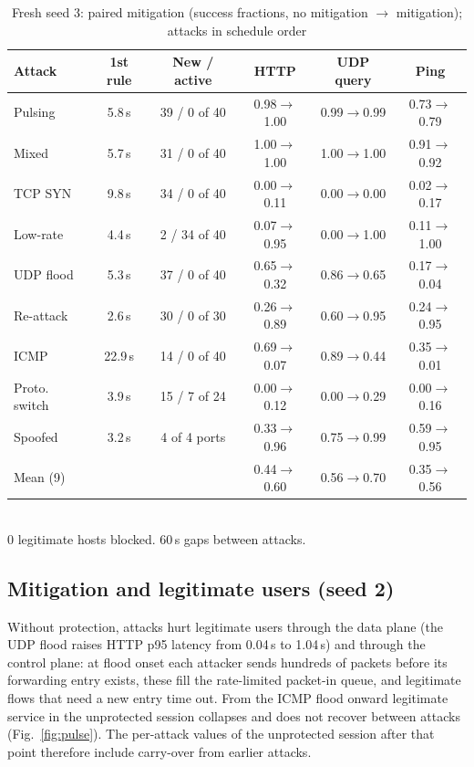 \documentclass[conference]{IEEEtran}
\begin{document}
\begin{table}[t]
\caption{Fresh seed 3: paired mitigation (success fractions, no mitigation $\to$ mitigation); attacks in schedule order}
\label{tab:seed3mit}
\centering
\setlength{\tabcolsep}{2.0pt}
\begin{tabular}{lccccc}
\toprule
Attack & 1st rule & New / active & HTTP & UDP query & Ping \\
\midrule
Pulsing & 5.8\,s & 39 / 0 of 40 & 0.98$\to$1.00 & 0.99$\to$0.99 & 0.73$\to$0.79 \\
Mixed & 5.7\,s & 31 / 0 of 40 & 1.00$\to$1.00 & 1.00$\to$1.00 & 0.91$\to$0.92 \\
TCP SYN & 9.8\,s & 34 / 0 of 40 & 0.00$\to$0.11 & 0.00$\to$0.00 & 0.02$\to$0.17 \\
Low-rate & 4.4\,s & 2 / 34 of 40 & 0.07$\to$0.95 & 0.00$\to$1.00 & 0.11$\to$1.00 \\
UDP flood & 5.3\,s & 37 / 0 of 40 & 0.65$\to$0.32 & 0.86$\to$0.65 & 0.17$\to$0.04 \\
Re-attack & 2.6\,s & 30 / 0 of 30 & 0.26$\to$0.89 & 0.60$\to$0.95 & 0.24$\to$0.95 \\
ICMP & 22.9\,s & 14 / 0 of 40 & 0.69$\to$0.07 & 0.89$\to$0.44 & 0.35$\to$0.01 \\
Proto. switch & 3.9\,s & 15 / 7 of 24 & 0.00$\to$0.12 & 0.00$\to$0.29 & 0.00$\to$0.16 \\
Spoofed & 3.2\,s & 4 of 4 ports & 0.33$\to$0.96 & 0.75$\to$0.99 & 0.59$\to$0.95 \\
\midrule
Mean (9) & & & 0.44$\to$0.60 & 0.56$\to$0.70 & 0.35$\to$0.56 \\
\bottomrule
\end{tabular}\\[2pt]
\footnotesize 0 legitimate hosts blocked. 60\,s gaps between attacks.
\end{table}

\subsection{Mitigation and legitimate users (seed 2)}
Without protection, attacks hurt legitimate users through the data plane (the UDP flood raises HTTP p95 latency from 0.04\,s to 1.04\,s) and through the control plane: at flood onset each attacker sends hundreds of packets before its forwarding entry exists, these fill the rate-limited packet-in queue, and legitimate flows that need a new entry time out. From the ICMP flood onward legitimate service in the unprotected session collapses and does not recover between attacks (Fig.~\ref{fig:pulse}). The per-attack values of the unprotected session after that point therefore include carry-over from earlier attacks.
\end{document}
